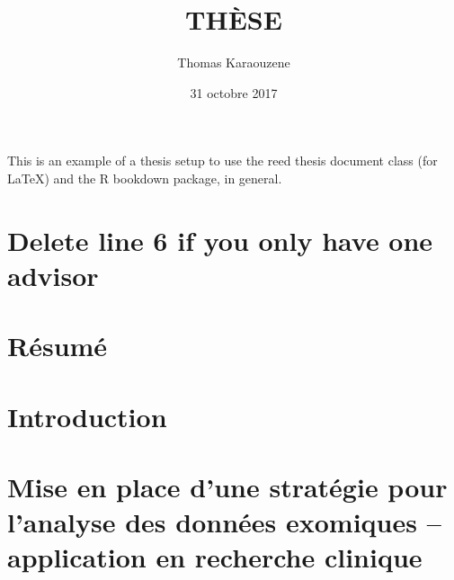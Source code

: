 \documentclass[12pt,twoside]{reedthesis}
\title{THÈSE}
\author{Thomas Karaouzene}
\date{31 octobre 2017}
\theoremstyle{definition}
\theoremstyle{definition}
\theoremstyle{remark}
\begin{document}
      \maketitle
  
  \frontmatter %
  \pagestyle{empty} %

  
      \begin{preface}
      This is an example of a thesis setup to use the reed thesis document
      class (for LaTeX) and the R bookdown package, in general.
    \end{preface}
  
      \hypersetup{linkcolor=black}
    \setcounter{tocdepth}{3}
    \tableofcontents
  
      \listoftables
  
      \listoffigures
  
  
  
  \mainmatter %
  \pagestyle{fancyplain} %

  \chapter{Delete line 6 if you only have one
  advisor}\label{delete-line-6-if-you-only-have-one-advisor}
  
  \chapter*{Résumé}\label{resume}
  
  \chapter{Introduction}\label{introInf}
  
  \chapter{Mise en place d'une stratégie pour l'analyse des données
  exomiques -- application en recherche
  clinique}\label{mise-en-place-dune-strategie-pour-lanalyse-des-donnees-exomiques-application-en-recherche-clinique}
  
  \newpage
  
\end{document}
